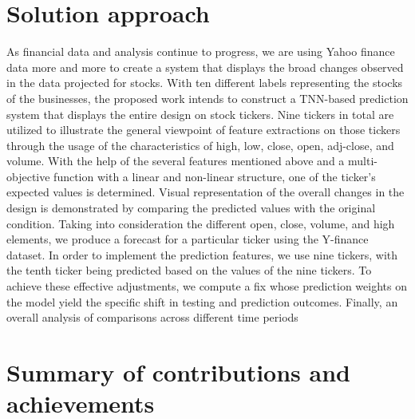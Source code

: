 \section{Solution approach}
\label{sec:intro_sol} %
As financial data and analysis continue to progress, we are using Yahoo finance data more and more to create a system that displays the broad changes observed in the data projected for stocks. With ten different labels representing the stocks of the businesses, the proposed work intends to construct a TNN-based prediction system that displays the entire design on stock tickers. Nine tickers in total are utilized to illustrate the general viewpoint of feature extractions on those tickers through the usage of the characteristics of high, low, close, open, adj-close, and volume. With the help of the several features mentioned above and a multi-objective function with a linear and non-linear structure, one of the ticker's expected values is determined. Visual representation of the overall changes in the design is demonstrated by comparing the predicted values with the original condition.
Taking into consideration the different open, close, volume, and high elements, we produce a forecast for a particular ticker using the Y-finance dataset. In order to implement the prediction features, we use nine tickers, with the tenth ticker being predicted based on the values of the nine tickers. To achieve these effective adjustments, we compute a fix whose prediction weights on the model yield the specific shift in testing and prediction outcomes. Finally, an overall analysis of comparisons across different time periods

\section{Summary of contributions and achievements} %
\label{sec:intro_sum_results} %




